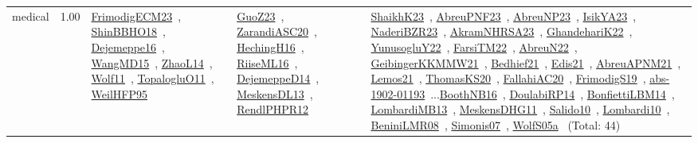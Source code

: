 {\begin{longtable}{p{3cm}r>{\raggedright\arraybackslash}p{6cm}>{\raggedright\arraybackslash}p{6cm}>{\raggedright\arraybackslash}p{8cm}}
\index{medical}\index{ApplicationAreas!medical}medical &  1.00 & \href{../works/FrimodigECM23.pdf}{FrimodigECM23}~\cite{FrimodigECM23}, \href{../works/ShinBBHO18.pdf}{ShinBBHO18}~\cite{ShinBBHO18}, \href{../works/Dejemeppe16.pdf}{Dejemeppe16}~\cite{Dejemeppe16}, \href{../works/WangMD15.pdf}{WangMD15}~\cite{WangMD15}, \href{../works/ZhaoL14.pdf}{ZhaoL14}~\cite{ZhaoL14}, \href{../works/Wolf11.pdf}{Wolf11}~\cite{Wolf11}, \href{../works/TopalogluO11.pdf}{TopalogluO11}~\cite{TopalogluO11}, \href{../works/WeilHFP95.pdf}{WeilHFP95}~\cite{WeilHFP95} & \href{../works/GuoZ23.pdf}{GuoZ23}~\cite{GuoZ23}, \href{../works/ZarandiASC20.pdf}{ZarandiASC20}~\cite{ZarandiASC20}, \href{../works/HechingH16.pdf}{HechingH16}~\cite{HechingH16}, \href{../works/RiiseML16.pdf}{RiiseML16}~\cite{RiiseML16}, \href{../works/DejemeppeD14.pdf}{DejemeppeD14}~\cite{DejemeppeD14}, \href{../works/MeskensDL13.pdf}{MeskensDL13}~\cite{MeskensDL13}, \href{../works/RendlPHPR12.pdf}{RendlPHPR12}~\cite{RendlPHPR12} & \href{../works/ShaikhK23.pdf}{ShaikhK23}~\cite{ShaikhK23}, \href{../works/AbreuPNF23.pdf}{AbreuPNF23}~\cite{AbreuPNF23}, \href{../works/AbreuNP23.pdf}{AbreuNP23}~\cite{AbreuNP23}, \href{../works/IsikYA23.pdf}{IsikYA23}~\cite{IsikYA23}, \href{../works/NaderiBZR23.pdf}{NaderiBZR23}~\cite{NaderiBZR23}, \href{../works/AkramNHRSA23.pdf}{AkramNHRSA23}~\cite{AkramNHRSA23}, \href{../works/GhandehariK22.pdf}{GhandehariK22}~\cite{GhandehariK22}, \href{../works/YunusogluY22.pdf}{YunusogluY22}~\cite{YunusogluY22}, \href{../works/FarsiTM22.pdf}{FarsiTM22}~\cite{FarsiTM22}, \href{../works/AbreuN22.pdf}{AbreuN22}~\cite{AbreuN22}, \href{../works/GeibingerKKMMW21.pdf}{GeibingerKKMMW21}~\cite{GeibingerKKMMW21}, \href{../works/Bedhief21.pdf}{Bedhief21}~\cite{Bedhief21}, \href{../works/Edis21.pdf}{Edis21}~\cite{Edis21}, \href{../works/AbreuAPNM21.pdf}{AbreuAPNM21}~\cite{AbreuAPNM21}, \href{../works/Lemos21.pdf}{Lemos21}~\cite{Lemos21}, \href{../works/ThomasKS20.pdf}{ThomasKS20}~\cite{ThomasKS20}, \href{../works/FallahiAC20.pdf}{FallahiAC20}~\cite{FallahiAC20}, \href{../works/FrimodigS19.pdf}{FrimodigS19}~\cite{FrimodigS19}, \href{../works/abs-1902-01193.pdf}{abs-1902-01193}~\cite{abs-1902-01193}...\href{../works/BoothNB16.pdf}{BoothNB16}~\cite{BoothNB16}, \href{../works/DoulabiRP14.pdf}{DoulabiRP14}~\cite{DoulabiRP14}, \href{../works/BonfiettiLBM14.pdf}{BonfiettiLBM14}~\cite{BonfiettiLBM14}, \href{../works/LombardiMB13.pdf}{LombardiMB13}~\cite{LombardiMB13}, \href{../works/MeskensDHG11.pdf}{MeskensDHG11}~\cite{MeskensDHG11}, \href{../works/Salido10.pdf}{Salido10}~\cite{Salido10}, \href{../works/Lombardi10.pdf}{Lombardi10}~\cite{Lombardi10}, \href{../works/BeniniLMR08.pdf}{BeniniLMR08}~\cite{BeniniLMR08}, \href{../works/Simonis07.pdf}{Simonis07}~\cite{Simonis07}, \href{../works/WolfS05a.pdf}{WolfS05a}~\cite{WolfS05a} (Total: 44)\\

\end{longtable}}

